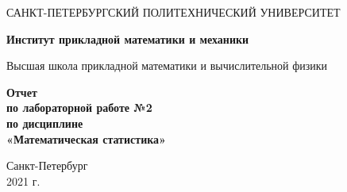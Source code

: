 \begin{titlepage}
   \begin{center}
       \vspace*{3cm}
       \large{САНКТ-ПЕТЕРБУРГСКИЙ ПОЛИТЕХНИЧЕСКИЙ УНИВЕРСИТЕТ}
       \vspace{0.4 cm}

       \large\textbf{Институт прикладной математики и механики}
       \vspace{0.4 cm}

       \large{Высшая школа прикладной математики и вычислительной физики}

       \vspace{3 cm}
       \normalsize\textbf{Отчет\\ по лабораторной работе №2\\ по дисциплине\\
«Математическая статистика»}
       \vfill

       \vspace{0.8cm}


       \normalsize{Санкт-Петербург\\2021 г.}

   \end{center}
\end{titlepage}